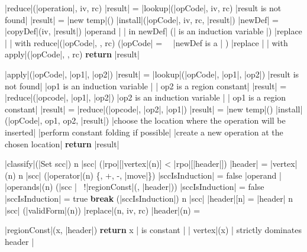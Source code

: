 \documentclass[a4paper,12pt, notitlepage]{article}
\newcommand{\negv}{\vspace{-0.7cm}}
\begin{document}
\begin{program}
\FUNCT |reduce|(|operation|, iv, rc) \BODY
    |result| = |lookup|(|opCode|, iv, rc)
    \IF |result is not found| \AR*
        |result| = |new temp|()
        |install|(|opCode|, iv, rc, |result|)
        |newDef| = |copyDef|(iv, |result|)
        \FOREACH |operand | \omega | in newDef| \DO
            \IF (\omega | is an induction variable |) \AR*
                |replace | \omega | with reduce|(|opCode|, \omega, rc)
            \ELSIF (|opCode| = \times \ \lor \ |newDef is a | \phi) \AR*
                |replace | \omega | with apply|(|opCode|, \omega, rc)
            \FI
        \OD
    \FI
    \textbf{return } |result|
\end{program} \negv
\begin{program}
\FUNCT |apply|(|opCode|, |op1|, |op2|) \BODY
    |result| = |lookup|(|opCode|, |op1|, |op2|)
    \IF |result is not found| \AR*
        \IF |op1 is an induction variable | \land | op2 is a region constant| \AR*
            |result| = |reduce|(|opcode|, |op1|, |op2|)
        \ELSIF |op2 is an induction variable | \land | op1 is a region constant| \AR*
            |result| = |reduce|(|opcode|, |op2|, |op1|)
        \ELSE
            |result| = |new temp|()
            |install|(|opCode|, op1, op2, |result|)
            |choose the location where the operation will be inserted|
            |perform constant folding if possible|
            |create a new operation at the chosen location|
    \FI
    \textbf{return } |result|
\end{program} \pagebreak
\begin{program}
\PROC |classify|(|Set scc|) \BODY
    \FOREACH n \in |scc| \DO
        \IF (|rpo|[|vertex|(n)] < |rpo|[|header|]) \AR*
            |header| = |vertex|(n)
        \FI
    \OD
    \FOREACH n \in |scc| \DO
        \IF (|operator|(n) \not\in \{\phi, +, -, |move|\}) \AR*
            |sccIsInduction| = false
        \ELSE
            \FOREACH |operand | \omega \in |operands|(n) \DO
                \IF (\omega \not\in |scc | \land \ !|regionConst|(\omega, |header|)) \AR*
                    |sccIsInduction| = false
                \ELSE
                    |sccIsInduction| = true
                    \textbf{break}
                \FI
            \OD
        \FI
    \OD
    \IF (|sccIsInduction|) \AR*
        \FOREACH n \in |scc| \DO
            |header|[n] = |header|
        \OD
    \ELSE
        \FOREACH n \in |scc| \DO
            \IF (|validForm|(n)) \AR*
                |replace|(n, iv, rc)
            \ELSE
                |header|(n) = \bot
            \FI
        \OD
    \FI
\end{program} \negv
\begin{program}
\FUNCT |regionConst|(x, |header|) \BODY
    \textbf{return } x | is constant | \lor | vertex|(x) | strictly dominates header |
\end{program}\negv
\end{document}
